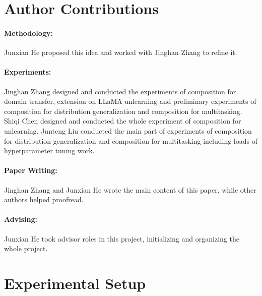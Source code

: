 
\section{Author Contributions}
\label{sec:apx_author}

\paragraph{Methodology:} Junxian He proposed this idea and worked with Jinghan Zhang to refine it.

\paragraph{Experiments:} Jinghan Zhang designed and conducted the experiments of composition for domain transfer, extension on LLaMA unlearning and preliminary experiments of composition for distribution generalization and composition for multitasking. Shiqi Chen designed and conducted the whole experiment of composition for unlearning. Junteng Liu conducted the main part of experiments of composition for distribution generalization and composition for multitasking including loads of hyperparameter tuning work.

\paragraph{Paper Writing:} Jinghan Zhang and Junxian He wrote the main content of this paper, while other authors helped proofread.

\paragraph{Advising:}
Junxian He took advisor roles in this project, initializing and organizing the whole project.

\section{Experimental Setup}
\label{sec:apx_exp_setup}

